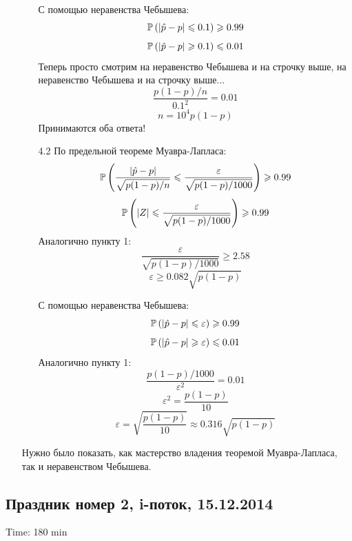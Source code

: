 \documentclass[12pt, a4paper]{article}\usepackage[]{graphicx}\usepackage[]{color}
\begin{document}
\begin{enumerate}
\begin{enumerate}
С помощью неравенства Чебышева:
\[ \P \left( |\hat{p} - p| \leqslant 0.1 \right) \geqslant 0.99 \]
\[ \P \left( |\hat{p} - p| \geqslant 0.1 \right) \leqslant 0.01 \]
Теперь просто смотрим на неравенство Чебышева и на строчку выше, на неравенство Чебышева и на строчку выше...
\[ \dfrac{p(1-p)/n}{0.1^2} = 0.01\]
\[ n = 10^4 p(1-p) \]
Принимаются оба ответа!

\item[4.2] По предельной теореме Муавра-Лапласа:
\[ \P \left( \dfrac{|\hat{p} - p|}{\sqrt{p(1-p)/n}} \leqslant \dfrac{\varepsilon}{\sqrt{p(1-p)/1000}} \right) \geqslant 0.99 \]
\[ \P \left( |Z| \leqslant \dfrac{\varepsilon}{\sqrt{p(1-p)/1000}} \right) \geqslant 0.99 \]
Аналогично пункту 1:
\[ \dfrac{\varepsilon}{\sqrt{p(1-p)/1000}} \geqslant 2.58 \]
\[ \varepsilon \geqslant 0.082 \sqrt{p(1-p)} \]

С помощью неравенства Чебышева:
\[ \P \left( |\hat{p} - p| \leqslant \varepsilon \right) \geqslant 0.99 \]
\[ \P \left( |\hat{p} - p| \geqslant \varepsilon \right) \leqslant 0.01 \]
Аналогично пункту 1:
\[ \dfrac{p(1-p)/1000}{\varepsilon^2} = 0.01\]
\[ \varepsilon^2 = \dfrac{p(1-p)}{10} \]
\[ \varepsilon = \sqrt{\dfrac{p(1-p)}{10}} \approx 0.316 \sqrt{p(1-p)} \]

\end{enumerate}

Нужно было показать, как мастерство владения теоремой Муавра-Лапласа, так и неравенством Чебышева.


\end{enumerate}


\subsection{Праздник номер 2, i-поток, 15.12.2014}

Time: 180 min
\end{document}
